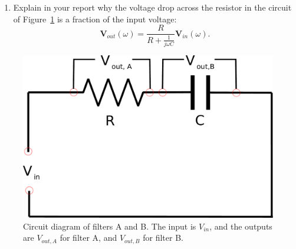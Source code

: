\documentclass{article}
\begin{document}
\begin{enumerate}
\item Explain in your report why the voltage drop across the resistor
  in the circuit of Figure~\ref{fig:filterAB} is a fraction of the
  input voltage:
  $$\mathbf{V}_{out}(\omega)=
  \frac{R}{R+{\frac {1}{j\omega C}}}\mathbf{V}_{in}(\omega).$$
\end{enumerate}
\begin{figure}
  \centering
  \includegraphics[width=\columnwidth]{images/RCfilter}
  \caption{Circuit diagram of filters A and B. The input is $V_{in}$,
    and the outputs are $V_{out,A}$ for filter A, and $V_{out,B}$ for
    filter B.}
  \label{fig:filterAB}
\end{figure}
\end{document}
